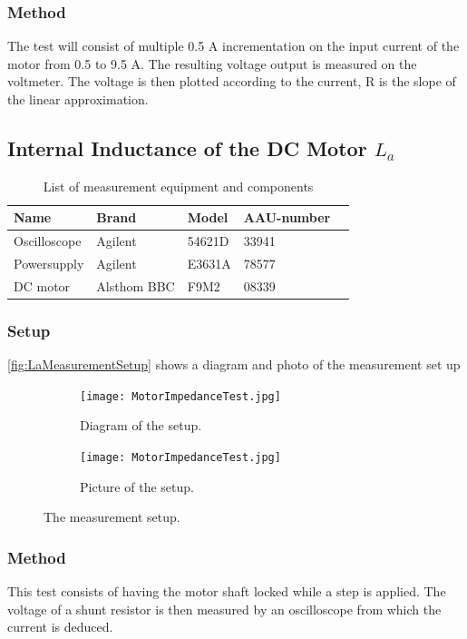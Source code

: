 \subsubsection*{Method}
The test will consist of multiple 0.5 A incrementation on the input current of the motor from 0.5 to 9.5 A. The resulting voltage output is measured on the voltmeter. The voltage is then plotted according to the current, R is the slope of the linear approximation.

\subsection{Internal Inductance of the DC Motor $L_a$}
\begin{table}[htbp]
	\centering
	\caption{List of measurement equipment and components}\label{tab_appendix:LaSetUp}

	\begin{tabularx}{\textwidth}{lXXXX}
		Name 				& Brand	& Model & AAU-number									\\ \toprule \rowcolor{lightGrey}
		Oscilloscope	& Agilent & 54621D & 33941 	\\
		Powersupply	& Agilent & E3631A & 78577\\ \rowcolor{lightGrey}
		DC motor & Alsthom BBC & F9M2& 08339
	\end{tabularx}
\end{table}
\subsubsection*{Setup}
\autoref{fig:LaMeasurementSetup} shows a diagram and photo of the measurement set up
\begin{figure}[htbp]
	\centering
	\begin{subfigure}{0.50\textwidth}
		\texttt{[image: MotorImpedanceTest.jpg]}
		\caption{Diagram of the setup.} \label{fig:LaMeasurementDiagram}
	\end{subfigure}
	\begin{subfigure}{0.40\textwidth}
		\texttt{[image: MotorImpedanceTest.jpg]}
		\caption{Picture of the setup.} \label{fig:LaMeasurementPictures}
	\end{subfigure}
	\caption{The measurement setup.} \label{fig:LaMeasurementSetup}   
\end{figure}

\subsubsection*{Method}
This test consists of having the motor shaft locked while a step is applied. The voltage of a shunt resistor is then measured by an oscilloscope from which the current is deduced.
